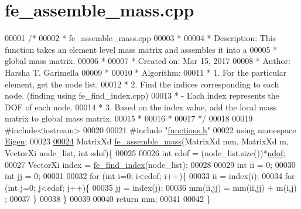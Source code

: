\hypertarget{fe__assemble__mass_8cpp_source}{}\section{fe\+\_\+assemble\+\_\+mass.\+cpp}
\label{fe__assemble__mass_8cpp_source}

\begin{DoxyCode}
00001 \textcolor{comment}{/*}
00002 \textcolor{comment}{ * fe\_assemble\_mass.cpp}
00003 \textcolor{comment}{ *}
00004 \textcolor{comment}{ * Description: This function takes an element level mass matrix and assembles it into a}
00005 \textcolor{comment}{ * global mass matrix.}
00006 \textcolor{comment}{ *}
00007 \textcolor{comment}{ *  Created on: Mar 15, 2017}
00008 \textcolor{comment}{ *  Author: Harsha T. Garimella}
00009 \textcolor{comment}{ *}
00010 \textcolor{comment}{ *  Algorithm:}
00011 \textcolor{comment}{ *  1. For the particular element, get the node list.}
00012 \textcolor{comment}{ *  2. Find the indices corresponding to each node. (finding using fe\_find\_index.cpp)}
00013 \textcolor{comment}{ *      - Each index represents the DOF of each node.}
00014 \textcolor{comment}{ *  3. Based on the index value, add the local mass matrix to global mass matrix.}
00015 \textcolor{comment}{ *}
00016 \textcolor{comment}{ *}
00017 \textcolor{comment}{ */}
00018 
00019 \textcolor{preprocessor}{#include<iostream>}
00020 
00021 \textcolor{preprocessor}{#include "\hyperlink{functions_8h}{functions.h}"}
00022 \textcolor{keyword}{using namespace }\hyperlink{namespace_eigen}{Eigen};
00023 
\hyperlink{fe__assemble__mass_8cpp_a04f569c566ca4fbea3b3a2a13cdd0af5}{00024} MatrixXd \hyperlink{fe__assemble__mass_8cpp_a04f569c566ca4fbea3b3a2a13cdd0af5}{fe\_assemble\_mass}(MatrixXd mm, MatrixXd m, VectorXi node\_list, \textcolor{keywordtype}{int} sdof)\{
00025 
00026     \textcolor{keywordtype}{int} edof = (node\_list.size())*\hyperlink{_global_variables_8h_aa789fe4d8a13fd0990b630909430d5d0}{ndof};
00027     VectorXi index = \hyperlink{functions_8h_ae4dbe24b761cafa3577afab76726b382}{fe\_find\_index}(node\_list);
00028 
00029     \textcolor{keywordtype}{int} ii = 0;
00030     \textcolor{keywordtype}{int} jj = 0;
00031 
00032     \textcolor{keywordflow}{for} (\textcolor{keywordtype}{int} i=0; i<edof; i++)\{
00033         ii = index(i);
00034         \textcolor{keywordflow}{for} (\textcolor{keywordtype}{int} j=0; j<edof; j++)\{
00035             jj = index(j);
00036             mm(ii,jj) = mm(ii,jj) + m(i,j) ;
00037         \}
00038     \}
00039 
00040     \textcolor{keywordflow}{return} mm;
00041 
00042 \}
\end{DoxyCode}
